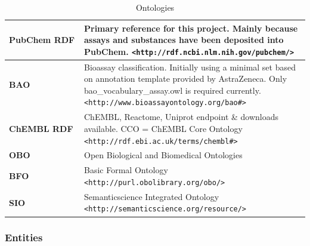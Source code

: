 \begin{table}[]
\caption{Ontologies}
\label{tab:opddr_01}
\centering
\begin{tabular}{p{0.25\linewidth}p{0.75\linewidth}}
\hline
\textbf{PubChem RDF} & Primary reference for this project.  Mainly because assays and substances have been deposited into PubChem. 
\texttt{\textless http://rdf.ncbi.nlm.nih.gov/pubchem/\textgreater} \\
\hline
\textbf{BAO} & Bioassay classification.  Initially using a minimal set based on annotation template provided by AstraZeneca.  Only bao\_vocabulary\_assay.owl is required currently.
\texttt{\textless http://www.bioassayontology.org/bao\#\textgreater} \\
\hline
\textbf{ChEMBL RDF} & ChEMBL, Reactome, Uniprot endpoint \& downloads available.
CCO = ChEMBL Core Ontology
\texttt{\textless http://rdf.ebi.ac.uk/terms/chembl\#\textgreater} \\
\hline
\textbf{OBO} & Open Biological and Biomedical Ontologies \\
\hline
\textbf{BFO} &  Basic Formal Ontology \texttt{\textless http://purl.obolibrary.org/obo/\textgreater} \\
\hline
\textbf{SIO} & Semanticscience Integrated Ontology
\texttt{\textless http://semanticscience.org/resource/\textgreater} \\
\hline
\end{tabular}
\end{table}


\subsubsection{Entities}

